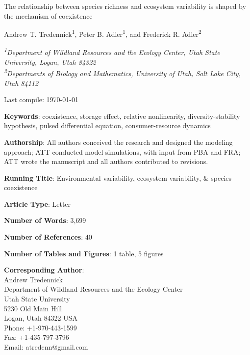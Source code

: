 \documentclass[12pt,]{article}
\title{}
\author{}
\date{}
\begin{document}
\renewcommand\linenumberfont{\normalfont\tiny\sffamily\color{gray}}
\newcommand{\new}{\textcolor{blue}}

\begin{singlespace}

\begin{centering}

\Large{The relationship between species richness and ecosystem variability is shaped by the mechanism of coexistence}

\bigskip{} \bigskip{}

\renewcommand*{\thefootnote}{\fnsymbol{footnote}}

\normalsize{Andrew T. Tredennick\textsuperscript{1}, Peter B. Adler\textsuperscript{1}, and Frederick R. Adler\textsuperscript{2}}

\bigskip{}

\textit{\small{\textsuperscript{1}Department of Wildland Resources and the Ecology Center, Utah State University, Logan, Utah 84322}} \\
\textit{\small{\textsuperscript{2}Departments of Biology and Mathematics, University of Utah, Salt Lake City, Utah 84112}} 

\end{centering}

\vspace{3em}

Last compile: \today

\noindent \textbf{Keywords}: coexistence, storage effect, relative nonlinearity, diversity-stability hypothesis, pulsed differential equation, consumer-resource dynamics

\noindent \textbf{Authorship}: All authors conceived the research and designed the modeling approach; ATT conducted model simulations, with input from PBA and FRA; ATT wrote the manuscript and all authors contributed to revisions.

\noindent \textbf{Running Title}: Environmental variability, ecosystem variability, \& species coexistence

\noindent \textbf{Article Type}: Letter

\noindent \textbf{Number of Words}: 3,699

\noindent \textbf{Number of References}: 40

\noindent \textbf{Number of Tables and Figures}: 1 table, 5 figures

\noindent \textbf{Corresponding Author}:  \\
\phantom{222}Andrew Tredennick  \\
\phantom{222}Department of Wildland Resources and the Ecology Center  \\
\phantom{222}Utah State University  \\
\phantom{222}5230 Old Main Hill  \\
\phantom{222}Logan, Utah 84322 USA  \\
\phantom{222}Phone: +1-970-443-1599  \\
\phantom{222}Fax: +1-435-797-3796  \\
\phantom{222}Email: atredenn@gmail.com

\end{singlespace}
\end{document}
